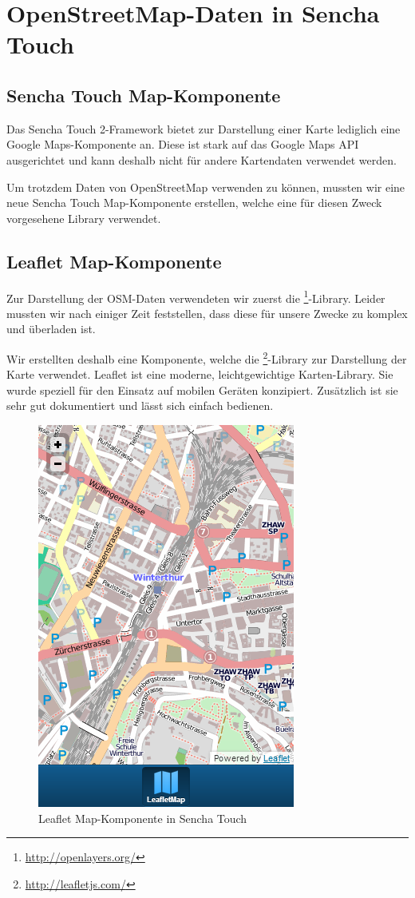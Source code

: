\chapter{OpenStreetMap-Daten in Sencha Touch}
\label{leaflet-sencha-komponente}

\section{Sencha Touch Map-Komponente}

Das Sencha Touch 2-Framework bietet zur Darstellung einer Karte lediglich eine Google Maps-Komponente an.
Diese ist stark auf das Google Maps API ausgerichtet und kann deshalb nicht für andere Kartendaten verwendet werden.

Um trotzdem Daten von \gls{OpenStreetMap} verwenden zu können, mussten wir eine neue Sencha Touch Map-Komponente erstellen, welche eine für diesen Zweck vorgesehene Library verwendet.

\section{Leaflet Map-Komponente}

Zur Darstellung der OSM-Daten verwendeten wir zuerst die \footnote{\url{http://openlayers.org/}}-Library.
Leider mussten wir nach einiger Zeit feststellen, dass diese für unsere Zwecke zu komplex und überladen ist.

Wir erstellten deshalb eine Komponente, welche die \footnote{\url{http://leafletjs.com/}}-Library zur Darstellung der Karte verwendet.
Leaflet ist eine moderne, leichtgewichtige Karten-Library.
Sie wurde speziell für den Einsatz auf mobilen Geräten konzipiert.
Zusätzlich ist sie sehr gut dokumentiert und lässt sich einfach bedienen.

\begin{figure}[H]
	\centering
	\includegraphics[scale=0.5]{images/implementation/frontend/leafletmap-screenshot}
	\caption{Leaflet Map-Komponente in Sencha Touch}
	\label{image-leafletmap-screenshot}
\end{figure}

